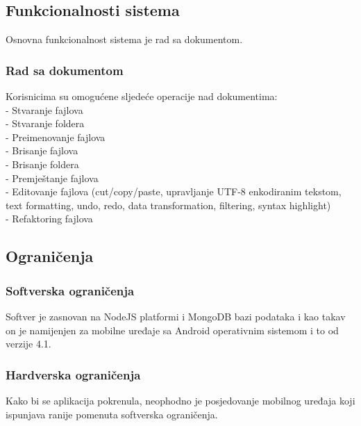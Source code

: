 \documentclass[utf8]{article}
\begin{document}
\subsection{Funkcionalnosti sistema}
Osnovna funkcionalnost sistema je rad sa dokumentom.
\subsubsection{Rad sa dokumentom}
Korisnicima su omogućene sljedeće operacije nad dokumentima:\\
- Stvaranje fajlova\\
- Stvaranje foldera\\
- Preimenovanje fajlova\\
- Brisanje fajlova\\
- Brisanje foldera\\
- Premještanje fajlova\\
- Editovanje fajlova (cut/copy/paste, upravljanje UTF-8 enkodiranim tekstom, text formatting, undo, redo, data transformation, filtering, syntax highlight)\\
- Refaktoring fajlova\\

\subsection{Ograničenja}
\subsubsection{Softverska ograničenja}
Softver je zasnovan na NodeJS platformi i MongoDB bazi podataka i kao takav on je namijenjen za mobilne uređaje sa Android operativnim sistemom i to od verzije 4.1.
\subsubsection{Hardverska ograničenja}
Kako bi se aplikacija pokrenula, neophodno je posjedovanje mobilnog uređaja koji ispunjava ranije pomenuta softverska ograničenja.
\end{document}
